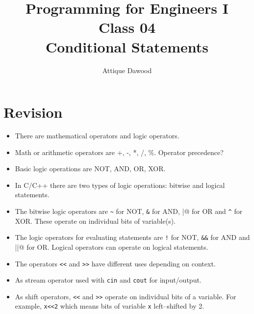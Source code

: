 \documentclass[12pt,a4paper]{article}
\title{\vspace{-2cm}Programming for Engineers I\\Class 04\\Conditional Statements}
\author{Attique Dawood}
\begin{document}
\maketitle
\section{Revision}
\begin{itemize}
\item There are mathematical operators and logic operators.
\item Math or arithmetic operators are +, -, *, /, \%. Operator precedence?
\item Basic logic operations are NOT, AND, OR, XOR.
\item In C/C++ there are two types of logic operations: bitwise and logical statements.
\item The bitwise logic operators are \verb|~| for NOT, \verb|&| for AND, \verb@|@ for OR and \verb|^| for XOR. These operate on individual bits of variable(s).
\item The logic operators for evaluating statements are \verb|!| for NOT, \verb|&&| for AND and \verb@||@ for OR. Logical operators can operate on logical statements.
\item The operators \verb|<<| and \verb|>>| have different uses depending on context.
\item As stream operator used with \verb|cin| and \verb|cout| for input/output.
\item As shift operators, \verb|<<| and \verb|>>| operate on individual bits of a variable. For example, \verb|x<<2| which means bits of variable \verb|x| left--shifted by 2.
\end{itemize}
\end{document}
